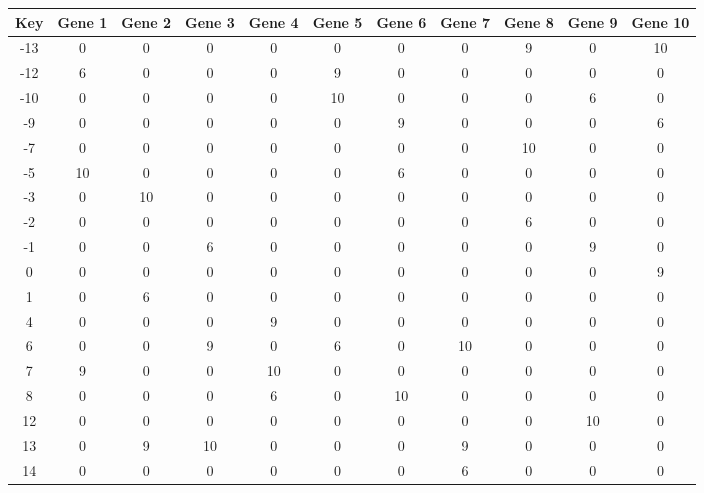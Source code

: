 \begin{tabular}{|c|c|c|c|c|c|c|c|c|c|c|}
\hline
Key & Gene 1 & Gene 2 & Gene 3 & Gene 4 & Gene 5 & Gene 6 & Gene 7 & Gene 8 & Gene 9 & Gene 10 \\
\hline
-13 & 0 & 0 & 0 & 0 & 0 & 0 & 0 & 9 & 0 & 10 \\
-12 & 6 & 0 & 0 & 0 & 9 & 0 & 0 & 0 & 0 & 0 \\
-10 & 0 & 0 & 0 & 0 & 10 & 0 & 0 & 0 & 6 & 0 \\
-9 & 0 & 0 & 0 & 0 & 0 & 9 & 0 & 0 & 0 & 6 \\
-7 & 0 & 0 & 0 & 0 & 0 & 0 & 0 & 10 & 0 & 0 \\
-5 & 10 & 0 & 0 & 0 & 0 & 6 & 0 & 0 & 0 & 0 \\
-3 & 0 & 10 & 0 & 0 & 0 & 0 & 0 & 0 & 0 & 0 \\
-2 & 0 & 0 & 0 & 0 & 0 & 0 & 0 & 6 & 0 & 0 \\
-1 & 0 & 0 & 6 & 0 & 0 & 0 & 0 & 0 & 9 & 0 \\
0 & 0 & 0 & 0 & 0 & 0 & 0 & 0 & 0 & 0 & 9 \\
1 & 0 & 6 & 0 & 0 & 0 & 0 & 0 & 0 & 0 & 0 \\
4 & 0 & 0 & 0 & 9 & 0 & 0 & 0 & 0 & 0 & 0 \\
6 & 0 & 0 & 9 & 0 & 6 & 0 & 10 & 0 & 0 & 0 \\
7 & 9 & 0 & 0 & 10 & 0 & 0 & 0 & 0 & 0 & 0 \\
8 & 0 & 0 & 0 & 6 & 0 & 10 & 0 & 0 & 0 & 0 \\
12 & 0 & 0 & 0 & 0 & 0 & 0 & 0 & 0 & 10 & 0 \\
13 & 0 & 9 & 10 & 0 & 0 & 0 & 9 & 0 & 0 & 0 \\
14 & 0 & 0 & 0 & 0 & 0 & 0 & 6 & 0 & 0 & 0 \\
\hline
\end{tabular}